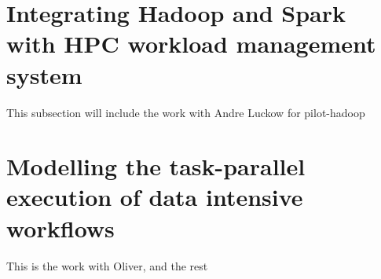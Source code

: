 \label{data_hpc}
\section{Integrating Hadoop and Spark with HPC workload management system}
\label{hadoop-pilot}
This subsection will include the work with Andre Luckow for pilot-hadoop

\section{Modelling the task-parallel execution of data intensive workflows}
\label{task-par}
This is the work with Oliver, and the rest